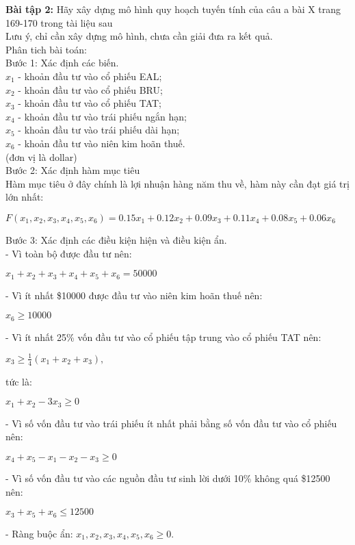 
\textbf{Bài tập 2:} Hãy xây dựng mô hình quy hoạch tuyến tính của câu a bài X trang 169-170 trong tài liệu sau 
\\
Lưu ý, chỉ cần xây dựng mô hình, chưa cần giải đưa ra kết quả.
\\
Phân tich bài toán:
\\
Bước 1: Xác định các biến.
\\
$x_1$ - khoản đầu tư vào cổ phiếu EAL;
\\
$x_2$ - khoản đầu tư vào cổ phiếu BRU;
\\
$x_3$ - khoản đầu tư vào cổ phiếu TAT;
\\
$x_4$ - khoản đầu tư vào trái phiếu ngắn hạn;
\\
$x_5$ - khoản đầu tư vào trái phiếu dài hạn;
\\
$x_6$ - khoản đầu tư vào niên kim hoãn thuế.
\\
(đơn vị là dollar)
\\
Bước 2: Xác định hàm mục tiêu
\\
Hàm mục tiêu ở đây chính là lợi nhuận hàng năm thu về, hàm này cần đạt giá trị lớn nhất:
\begin{center}
    $F(x_1, x_2, x_3, x_4, x_5, x_6) = 0.15 x_1 + 0.12 x_2 + 0.09 x_3 + 0.11 x_4 + 0.08 x_5 + 0.06 x_6$
\end{center}
Bước 3: Xác định các điều kiện hiện và điều kiện ẩn.
\\
- Vì toàn bộ  được đầu tư nên:
\begin{center}
    $x_1 + x_2 + x_3 + x_4 + x_5 + x_6 = 50000$
\end{center}
- Vì ít nhất \$10000 được đầu tư vào niên kim hoãn thuế nên:
\begin{center}
    $x_6 \geq 10000$
\end{center}
- Vì ít nhất 25\% vốn đầu tư vào cổ phiếu tập trung vào cổ phiếu TAT nên:
\begin{center}
    $x_3 \geq \frac{1}{4} (x_1 + x_2 + x_3),$
\end{center}
tức là:
\begin{center}
    $x_1 + x_2 - 3 x_3 \geq 0$
\end{center}
- Vì số vốn đầu tư vào trái phiếu ít nhất phải bằng số vốn đầu tư vào cổ phiếu nên:
\begin{center}
    $x_4 + x_5 - x_1 - x_2 - x_3 \geq 0$
\end{center}
- Vì số vốn đầu tư vào các nguồn đầu tư sinh lời dưới 10\% không quá \$12500 nên:
\begin{center}
    $x_3 + x_5 + x_6 \leq 12500$
\end{center}
- Ràng buộc ẩn: $x_1, x_2, x_3, x_4, x_5, x_6 \geq 0.$
\\

